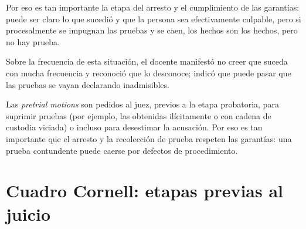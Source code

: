 \documentclass[12pt,oneside]{book}
\begin{document}
Por eso es tan importante la etapa del arresto y el cumplimiento de las garantías: puede ser claro lo que sucedió y que la persona sea efectivamente culpable, pero si procesalmente se impugnan las pruebas y se caen, los hechos son los hechos, pero no hay prueba.

Sobre la frecuencia de esta situación, el docente manifestó no creer que suceda con mucha frecuencia y reconoció que lo desconoce; indicó que puede pasar que las pruebas se vayan declarando inadmisibles.

\begin{important}
Las \textit{pretrial motions} son pedidos al juez, previos a la etapa probatoria, para suprimir pruebas (por ejemplo, las obtenidas ilícitamente o con cadena de custodia viciada) o incluso para desestimar la acusación. Por eso es tan importante que el arresto y la recolección de prueba respeten las garantías: una prueba contundente puede caerse por defectos de procedimiento.
\end{important}

\section{Cuadro Cornell: etapas previas al juicio}
\end{document}

